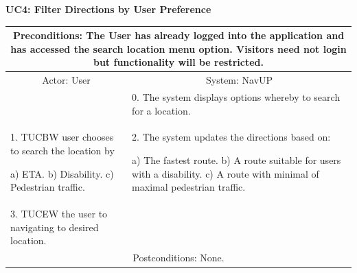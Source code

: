 ﻿\documentclass{article}
\begin{document}
        \newpage
				 \vspace{5mm}
                 \begin{flushleft}
                 \textbf{UC4: Filter Directions by User Preference}\\
                  \end{flushleft}
        		\centering	
       		 \small
       		 \begin{tabular}{|p{6cm}|p{6cm}|}
       		 \hline
       		\multicolumn{2}{c}{\parbox{12cm}{\vspace{2mm} Preconditions: The User has already logged into the application and has accessed the search location menu option. Visitors need not login but functionality will be restricted.\vspace{2mm}}} \\
       		 \hline
       		 \multicolumn{1}{c}{Actor: User} & \multicolumn{1}{c}{ System: NavUP} \\
        		\hline
       		 & 0.	The system displays options whereby to search for a location.\\
       		 \hline
       		  1.	TUCBW user chooses to search the location by 

						a)	ETA.
						b)	Disability.
						c)	Pedestrian traffic.
 				& 2.	The system updates the directions based on:

						a)	The fastest route.
						b)	A route suitable for users with a disability.
						c)	A route with minimal of maximal pedestrian traffic.
\\
        		\hline
       		 	3.	TUCEW the user to navigating to desired location. &\\
       		 \hline
        		\multicolumn{2}{c}{Postconditions: None.} \\
        		\hline
        \end{tabular} 
     
\end{document}
